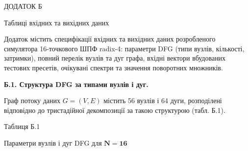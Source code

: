 \documentclass[
]{article}
\begin{document}
\protect{}\label{_Toc230737412}{}ДОДАТОК Б

Таблиці вхідних та вихідних даних

Додаток містить специфікації вхідних та вихідних даних розробленого
симулятора 16-точкового ШПФ radix-4: параметри DFG (типи вузлів,
кількості, затримки), повний перелік вузлів та дуг графа, вхідні вектори
вбудованих тестових пресетів, очікувані спектри та значення поворотних
множників.

\textbf{Б.1. Структура DFG за типами вузлів і дуг.}

Граф потоку даних \(G = (V,E)\) містить 56 вузлів і 64 дуги, розподілені
відповідно до тристадійної декомпозиції за такою структурою (табл. Б.1).

Таблиця Б.1

Параметри вузлів і дуг DFG для \(\mathbf{N}\mathbf{=}\mathbf{16}\)
\end{document}
